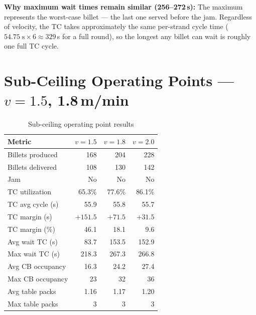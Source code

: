\documentclass[11pt,a4paper]{article}
\begin{document}
\textbf{Why maximum wait times remain similar (256--272\,s):} The maximum represents the worst-case billet --- the last one served before the jam. Regardless of velocity, the TC takes approximately the same per-strand cycle time ($54.75\;\text{s} \times 6 \approx 329$\,s for a full round), so the longest any billet can wait is roughly one full TC cycle.

\section{Sub-Ceiling Operating Points --- $v = 1.5$, 1.8\,m/min}
\label{sec:sub-ceiling}

\begin{table}[H]
\centering
\caption{Sub-ceiling operating point results}
\label{tab:sub-ceiling}
\begin{tabular}{@{}lrrr@{}}
\toprule
Metric & $v = 1.5$ & $v = 1.8$ & $v = 2.0$ \\
\midrule
Billets produced & 168 & 204 & 228 \\
Billets delivered & 108 & 130 & 142 \\
Jam & No & No & No \\
TC utilization & 65.3\% & 77.6\% & 86.1\% \\
TC avg cycle (s) & 55.9 & 55.8 & 55.7 \\
TC margin (s) & $+151.5$ & $+71.5$ & $+31.5$ \\
TC margin (\%) & 46.1 & 18.1 & 9.6 \\
Avg wait TC (s) & 83.7 & 153.5 & 152.9 \\
Max wait TC (s) & 218.3 & 267.3 & 266.8 \\
Avg CB occupancy & 16.3 & 24.2 & 27.4 \\
Max CB occupancy & 23 & 32 & 36 \\
Avg table packs & 1.16 & 1.17 & 1.20 \\
Max table packs & 3 & 3 & 3 \\
\bottomrule
\end{tabular}
\end{table}
\end{document}

